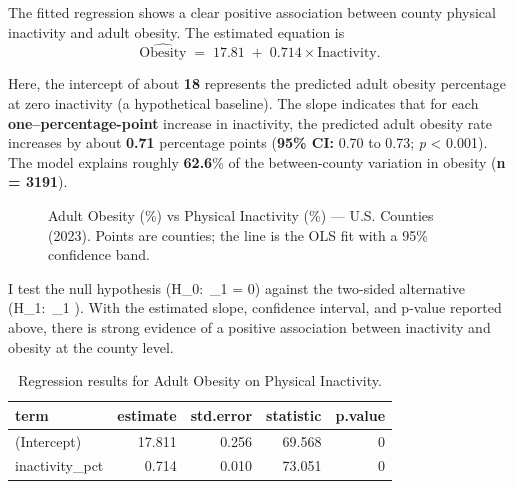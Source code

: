 \documentclass[
  letterpaper,
  DIV=11,
  numbers=noendperiod]{scrartcl}
\begin{document}
The fitted regression shows a clear positive association between county
physical inactivity and adult obesity. The estimated equation is \[
\widehat{\text{Obesity}} \;=\; 17.81 \;+\; 0.714 \times \text{Inactivity}.
\]

Here, the intercept of about \textbf{18} represents the predicted adult
obesity percentage at zero inactivity (a hypothetical baseline). The
slope indicates that for each \textbf{one--percentage-point} increase in
inactivity, the predicted adult obesity rate increases by about
\textbf{0.71} percentage points (\textbf{95\% CI:} 0.70 to 0.73;
\emph{p} \textless{} 0.001). The model explains roughly \textbf{62.6}\%
of the between-county variation in obesity (\textbf{n = 3191}).

\begin{figure}


\caption{\label{fig-county-scatter}Adult Obesity (\%) vs Physical
Inactivity (\%) --- U.S. Counties (2023). Points are counties; the line
is the OLS fit with a 95\% confidence band.}

\end{figure}%

I test the null hypothesis (H\_0:~\beta\_1 = 0) against the two-sided
alternative (H\_1:~\beta\_1 ). With the estimated slope,
confidence interval, and p-value reported above, there is strong
evidence of a positive association between inactivity and obesity at the
county level.

\begin{longtable}[]{@{}lrrrr@{}}

\caption{\label{tbl-model}Regression results for Adult Obesity on
Physical Inactivity.}

\tabularnewline

\toprule\noalign{}
term & estimate & std.error & statistic & p.value \\
\midrule\noalign{}
\endhead
\bottomrule\noalign{}
\endlastfoot
(Intercept) & 17.811 & 0.256 & 69.568 & 0 \\
inactivity\_pct & 0.714 & 0.010 & 73.051 & 0 \\

\end{longtable}
\end{document}
